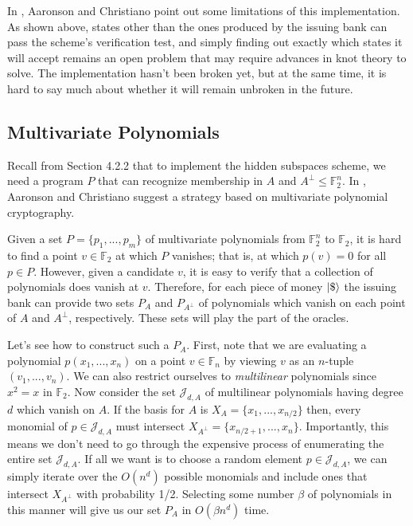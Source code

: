 \documentclass[12pt]{article}
\begin{document}
In \cite{Aar13}, Aaronson and Christiano point out some limitations of this implementation.  As shown above, states other than the ones produced by the issuing bank can pass the scheme's verification test, and simply finding out exactly which states it will accept remains an open problem that may require advances in knot theory to solve.  The implementation hasn't been broken yet, but at the same time, it is hard to say much about whether it will remain unbroken in the future.

\subsection{Multivariate Polynomials}
Recall from Section 4.2.2 that to implement the hidden subspaces scheme, we need a program $P$ that can recognize membership in $A$ and $A^\perp \leq \mathbb{F}_2^n$.  In \cite{Aar13}, Aaronson and Christiano suggest a strategy based on multivariate polynomial cryptography.

Given a set $P = \{p_1,...,p_m\}$ of multivariate polynomials from $\mathbb{F}_2^n$ to $\mathbb{F}_2$, it is hard to find a point $v \in \mathbb{F}_2$ at which $P$ vanishes; that is, at which $p(v) = 0$ for all $p \in P$.  However, given a candidate $v$, it is easy to verify that a collection of polynomials does vanish at $v$.  Therefore, for each piece of money $\Ket{\$}$ the issuing bank can provide two sets $P_A$ and $P_{A^\perp}$ of polynomials which vanish on each point of $A$ and $A^\perp$, respectively.  These sets will play the part of the oracles.

Let's see how to construct such a $P_A$.  First, note that we are evaluating a polynomial $p(x_1, ..., x_n)$ on a point $v \in \mathbb{F}_n$ by viewing $v$ as an $n$-tuple $(v_1, ..., v_n)$.  We can also restrict ourselves to \emph{multilinear} polynomials since $x^2 = x$ in $\mathbb{F}_2$.  Now consider the set $\mathscr{J}_{d,A}$ of multilinear polynomials having degree $d$ which vanish on $A$.  If the basis for $A$ is $X_A = \{x_1, ..., x_{n/2}\}$ then, every monomial of $p \in \mathscr{J}_{d,A}$ must intersect $X_{A^\perp} = \{x_{n/2 + 1}, ..., x_n\}$.  Importantly, this means we don't need to go through the expensive process of enumerating the entire set $\mathscr{J}_{d,A}$.  If all we want is to choose a random element $p \in \mathscr{J}_{d,A}$, we can simply iterate over the $O(n^d)$ possible monomials and include ones that intersect $X_{A^\perp}$ with probability 1/2.  Selecting some number $\beta$ of polynomials in this manner will give us our set $P_A$ in $O(\beta n^d)$ time.
\end{document}
